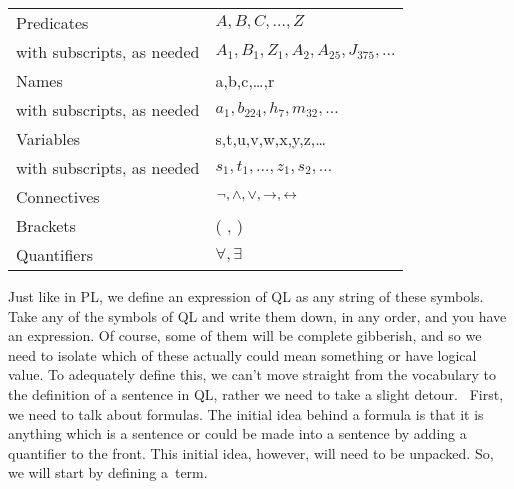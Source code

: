 \begin{center}
\begin{tabular}{l| l}
Predicates & $A,B,C,\ldots,Z$\\
with subscripts, as needed & $A_1, B_1,Z_1,A_2,A_{25},J_{375},\ldots$\\\hline
Names&a,b,c,\ldots ,r\\
with subscripts, as needed &$a_1,b_{224},h_7,m_{32},\ldots$\\\hline
Variables&s,t,u,v,w,x,y,z,\ldots\\
with subscripts, as needed &$s_1,t_1,\ldots,z_1,s_2,\ldots$\\\hline
Connectives & $\neg,\wedge,\vee,\rightarrow,\leftrightarrow$\\\hline
Brackets &( , )\\\hline
Quantifiers&$\forall,\exists$\\\hline
\end{tabular}
\end{center}

Just like in PL, we define an expression of QL as any string of these symbols. Take any of the symbols of QL and write them down, in any order, and you have an expression. Of course, some of them will be complete gibberish, and so we need to isolate which of these actually could mean something or have logical value. To adequately define this, we can't move straight from the vocabulary to the definition of a sentence in QL, rather we need to take a slight detour.  First, we need to talk about \glspl{formula}. The initial idea behind a formula is that it is anything which is a sentence or could be made into a sentence by adding a quantifier to the front. This initial idea, however, will need to be unpacked. So, we will start by defining a \gls{term}.

